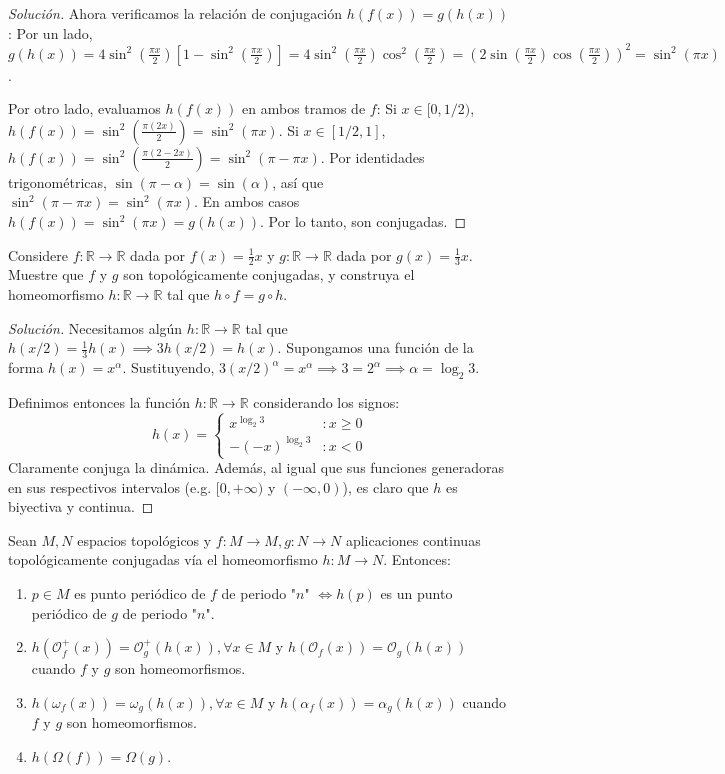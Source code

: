 \begin{proof}[Solución]
	Ahora verificamos la relación de conjugación $h(f(x)) = g(h(x))$:
	Por un lado, $g(h(x)) = 4\sin^2(\frac{\pi x}{2})\left[1 - \sin^2(\frac{\pi x}{2})\right] = 4\sin^2(\frac{\pi x}{2})\cos^2(\frac{\pi x}{2}) = \left(2\sin(\frac{\pi x}{2})\cos(\frac{\pi x}{2})\right)^2 = \sin^2(\pi x)$.
	
	Por otro lado, evaluamos $h(f(x))$ en ambos tramos de $f$:
	Si $x \in [0, 1/2)$, $h(f(x)) = \sin^2(\frac{\pi(2x)}{2}) = \sin^2(\pi x)$.
	Si $x \in [1/2, 1]$, $h(f(x)) = \sin^2(\frac{\pi(2-2x)}{2}) = \sin^2(\pi - \pi x)$. Por identidades trigonométricas, $\sin(\pi - \alpha) = \sin(\alpha)$, así que $\sin^2(\pi - \pi x) = \sin^2(\pi x)$.
	En ambos casos $h(f(x)) = \sin^2(\pi x) = g(h(x))$. Por lo tanto, son conjugadas.
\end{proof}

\begin{ejemplo}
	Considere $f: \mathbb{R} \to \mathbb{R}$ dada por $f(x) = \frac{1}{2}x$ y $g: \mathbb{R} \to \mathbb{R}$ dada por $g(x) = \frac{1}{3}x$. Muestre que $f$ y $g$ son topológicamente conjugadas, y construya el homeomorfismo $h: \mathbb{R} \to \mathbb{R}$ tal que $h \circ f = g \circ h$.
\end{ejemplo}
\begin{proof}[Solución]
	Necesitamos algún $h: \mathbb{R} \to \mathbb{R}$ tal que $h(x/2) = \frac{1}{3}h(x) \implies 3h(x/2) = h(x)$.
	Supongamos una función de la forma $h(x) = x^\alpha$. Sustituyendo, $3(x/2)^\alpha = x^\alpha \implies 3 = 2^\alpha \implies \alpha = \log_2 3$.
	
	Definimos entonces la función $h: \mathbb{R} \to \mathbb{R}$ considerando los signos:
	$$ h(x) = \begin{cases} 
		x^{\log_2 3} & : x \ge 0 \\ 
		-(-x)^{\log_2 3} & : x < 0 
	\end{cases} $$
	Claramente conjuga la dinámica. Además, al igual que sus funciones generadoras en sus respectivos intervalos (e.g. $[0, +\infty)$ y $(-\infty, 0)$), es claro que $h$ es biyectiva y continua.
\end{proof}

\begin{teorema}
	Sean $M, N$ espacios topológicos y $f: M \to M, g: N \to N$ aplicaciones continuas topológicamente conjugadas vía el homeomorfismo $h: M \to N$. Entonces:
	\begin{enumerate}[1)]
		\item $p \in M$ es punto periódico de $f$ de periodo "$n$" $\iff h(p)$ es un punto periódico de $g$ de periodo "$n$".
		\item $h(\mathcal{O}_f^+(x)) = \mathcal{O}_g^+(h(x)), \forall x \in M$ y $h(\mathcal{O}_f(x)) = \mathcal{O}_g(h(x))$ cuando $f$ y $g$ son homeomorfismos.
		\item $h(\omega_f(x)) = \omega_g(h(x)), \forall x \in M$ y $h(\alpha_f(x)) = \alpha_g(h(x))$ cuando $f$ y $g$ son homeomorfismos.
		\item $h(\Omega(f)) = \Omega(g)$.
	\end{enumerate}
\end{teorema}

